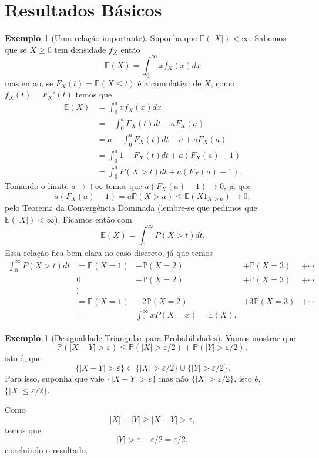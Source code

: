 \documentclass[12pt,a4paper,oneside]{book}
\theoremstyle{definition}
\newtheorem{example}[theorem]{Exemplo}
\theoremstyle{remark}
\numberwithin{equation}{section}
\newcommand{\e}{\varepsilon}
\newcommand{\E}{\mathbb{E}}
\newcommand{\pr}{\mathbb{P}}
\begin{document}
\newpage

\section{Resultados Básicos}








\begin{example}[Uma relação importante] Suponha que $\E(|X|)<\infty.$ Sabemos que se $X\geq 0 $ tem densidade $f_X$ então
$$\E(X) = \int_0^\infty xf_X(x)dx $$
mas entao, se $F_X(t) = \pr(X\leq t)$ é a cumulativa de  $X$, como $f_X(t) = F_X'(t)$ temos que
\begin{align*}
\E(X) &= \int_0^a xf_X(x)dx\\
 	&= -\int_0^a F_X(t)dt +  aF_X(a) \\
 	&= a-\int_0^a F_X(t)dt -a +  aF_X(a)\\
 	&= \int_0^a1- F_X(t)dt +  a(F_X(a)-1)\\
  	&= \int_0^a P(X>t)dt +  a(F_X(a)-1).
\end{align*}
Tomando o limite $a\rightarrow +\infty$ temos que  $a(F_X(a)-1) \rightarrow 0$, já que
$$ a(F_X(a)-1) = a\pr(X>a)\leq \E(X1_{X>a})\rightarrow 0,$$
pelo Teorema da Convergência Dominada (lembre-se que pedimos que $\E(|X|)<\infty$). 
Ficamos então com 
$$\E(X) =\int_0^\infty P(X>t)dt. $$
Essa relação fica bem clara no caso discreto, já que temos
$$ 
\begin{array}{cccccccccccccccccccc}
\int_0^\infty P(X>t)dt &= \pr(X=1) &+ \pr(X=2) &+\pr(X=3) &+ \cdots\\
      &0   &+ \pr(X=2) &+\pr(X=3) &+ \cdots\\
      &\vdots&\\
      &= \pr(X=1) &+ 2\pr(X=2) &+ 3\pr(X=3) &+ \cdots\\
      &=& \int_0^\infty xP(X=x) = \E(X).

\end{array}
$$

\end{example}


\begin{tcolorbox}
\begin{example}[Desigualdade Triangular para Probabilidades] Vamos mostrar que
$$\pr(|X-Y|>\e)\leq \pr(|X|>\e/2) +\pr(|Y|>\e/2), $$
isto é, que
$$\{|X-Y|>\e\} \subset \{|X|>\e/2\}\cup \{|Y|>\e/2\}. $$
Para isso, suponha  que vale $\{|X-Y|>\e\}$ mas  não $\{|X|>\e/2\}$, isto é,  $\{|X|\leq\e/2\}$. 

Como
$$|X|+|Y|\geq |X-Y|>  \e, $$ temos que
$$|Y| > \e - \e/2 = \e/2, $$
concluindo o resultado.
\end{example}
\end{tcolorbox}
\end{document}
